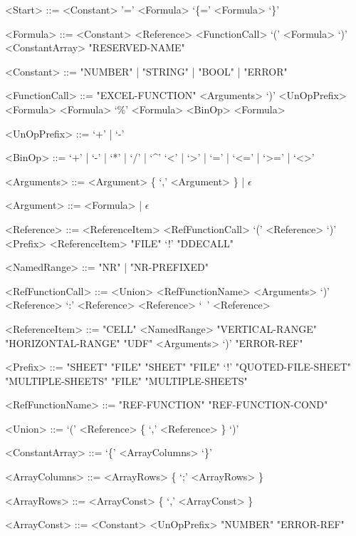 \begin{grammar}
	<Start> ::= <Constant>
	\alt '=' <Formula>
	\alt `\{=' <Formula> `\}'
	
	<Formula> ::= <Constant>
	\alt <Reference>
	\alt <FunctionCall>
	\alt `(' <Formula> `)'
	\alt <ConstantArray>
	\alt "RESERVED-NAME"
	
	<Constant> ::= "NUMBER" | "STRING" | "BOOL" | "ERROR"
	
	<FunctionCall> ::= "EXCEL-FUNCTION" <Arguments> `)'
	\alt <UnOpPrefix> <Formula>
	\alt <Formula> `\%'
	\alt <Formula> <BinOp> <Formula>
	
	<UnOpPrefix> ::= `+' | `-'
	
	<BinOp> ::= `+' | `-' | `*' | `/' | `\textasciicircum'
	\alt `<' | `>' | `=' | `<=' | `>=' | `<>'
	
	
	<Arguments> ::= <Argument> \{ `,' <Argument> \} | $\epsilon$
	
	<Argument> ::= <Formula> | $\epsilon$
	
	<Reference> ::= <ReferenceItem>
	\alt <RefFunctionCall>
	\alt `(' <Reference> `)' 
	\alt <Prefix> <ReferenceItem>
	\alt "FILE" `!' "DDECALL"
	
	<NamedRange> ::= "NR" | "NR-PREFIXED"
	
	\columnbreak
	
	<RefFunctionCall> ::= <Union>
	\alt <RefFunctionName> <Arguments> `)'
	\alt <Reference> `:' <Reference>
	\alt <Reference> `\ ' <Reference>
	
	<ReferenceItem> ::= "CELL"
	\alt <NamedRange>
	\alt "VERTICAL-RANGE"
	\alt "HORIZONTAL-RANGE"
	\alt "UDF" <Arguments> `)'
	\alt "ERROR-REF"
	
	<Prefix> ::= "SHEET"
	\alt "FILE" "SHEET"
	\alt "FILE" `!'
	\alt "QUOTED-FILE-SHEET"
	\alt "MULTIPLE-SHEETS"
	\alt "FILE" "MULTIPLE-SHEETS"
	
	<RefFunctionName> ::= "REF-FUNCTION"
	\alt "REF-FUNCTION-COND"
	
	
	
	<Union> ::= `(' <Reference> \{ `,' <Reference> \} `)'
	
	
	<ConstantArray> ::= `\{' <ArrayColumns> `\}'
	
	<ArrayColumns> ::= <ArrayRows> \{ `;' <ArrayRows> \}
	
	<ArrayRows> ::= <ArrayConst> \{ `,' <ArrayConst> \}
	
	<ArrayConst> ::= <Constant>
	\alt <UnOpPrefix> "NUMBER"
	\alt "ERROR-REF"
	
\end{grammar}
